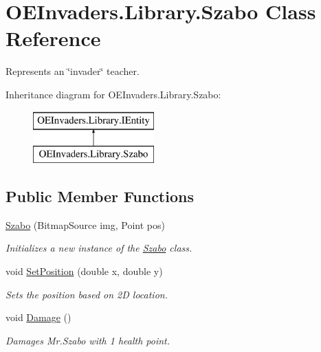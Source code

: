\hypertarget{class_o_e_invaders_1_1_library_1_1_szabo}{}\section{O\+E\+Invaders.\+Library.\+Szabo Class Reference}
\label{class_o_e_invaders_1_1_library_1_1_szabo}


Represents an \char`\"{}invader\char`\"{} teacher.  


Inheritance diagram for O\+E\+Invaders.\+Library.\+Szabo\+:\begin{figure}[H]
\begin{center}
\leavevmode
\includegraphics[height=2.000000cm]{class_o_e_invaders_1_1_library_1_1_szabo}
\end{center}
\end{figure}
\subsection*{Public Member Functions}
\begin{DoxyCompactItemize}
\item 
\mbox{\hyperlink{class_o_e_invaders_1_1_library_1_1_szabo_ae1df4344d4182e0d71d829bf89ee1e23}{Szabo}} (Bitmap\+Source img, Point pos)
\begin{DoxyCompactList}\small\item\em Initializes a new instance of the \mbox{\hyperlink{class_o_e_invaders_1_1_library_1_1_szabo}{Szabo}} class. \end{DoxyCompactList}\item 
void \mbox{\hyperlink{class_o_e_invaders_1_1_library_1_1_szabo_ac6ad2984cd7d74f7da5e2963f5e69a8f}{Set\+Position}} (double x, double y)
\begin{DoxyCompactList}\small\item\em Sets the position based on 2D location. \end{DoxyCompactList}\item 
void \mbox{\hyperlink{class_o_e_invaders_1_1_library_1_1_szabo_a7040cd46c3f1254f6f568c627be72803}{Damage}} ()
\begin{DoxyCompactList}\small\item\em Damages Mr.\+Szabo with 1 health point. \end{DoxyCompactList}\end{DoxyCompactItemize}
